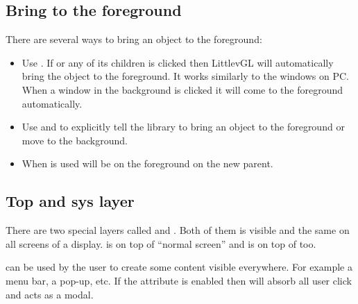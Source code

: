 \documentclass[letterpaper,10pt,english]{sphinxmanual}
\begin{document}
\subsection{Bring to the foreground}
\label{\detokenize{overview/layers:bring-to-the-foreground}}
There are several ways to bring an object to the foreground:
\begin{itemize}
\item {} 
Use . If  or any of its children is clicked then LittlevGL will automatically bring the object to the foreground.
It works similarly to the windows on PC. When a window in the background is clicked it will come to the foreground automatically.

\item {} 
Use  and  to explicitly tell the library to bring an object to the foreground or move to the background.

\item {} 
When  is used  will be on the foreground on the new parent.

\end{itemize}


\subsection{Top and sys layer}
\label{\detokenize{overview/layers:top-and-sys-layer}}
There are two special layers called  and .
Both of them is visible and the same on all screens of a display.  is on top of “normal screen” and  is on top of  too.

 can be used by the user to create some content visible everywhere. For example a menu bar, a pop-up, etc. If the  attribute is enabled then  will absorb all user click and acts as a modal.

\begin{sphinxVerbatim}[commandchars=\\\{\}]
 
\end{sphinxVerbatim}
\end{document}
